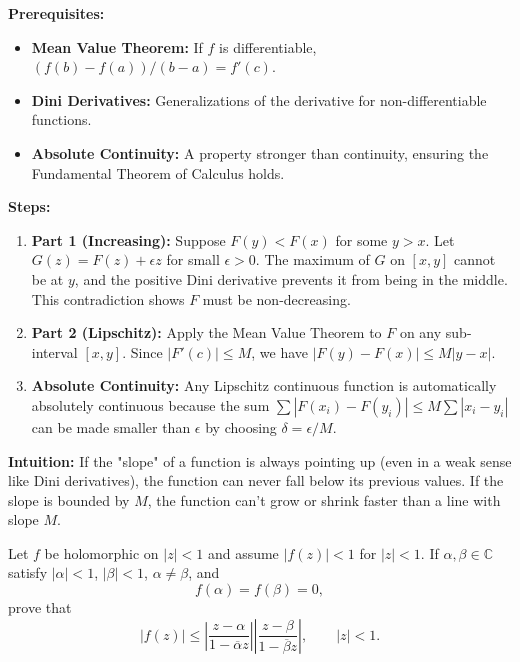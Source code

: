 \begin{solution}
\textbf{Prerequisites:}
\begin{itemize}
    \item \textbf{Mean Value Theorem:} If $f$ is differentiable, $(f(b)-f(a))/(b-a) = f'(c)$.
    \item \textbf{Dini Derivatives:} Generalizations of the derivative for non-differentiable functions.
    \item \textbf{Absolute Continuity:} A property stronger than continuity, ensuring the Fundamental Theorem of Calculus holds.
\end{itemize}

\textbf{Steps:}
\begin{enumerate}
    \item \textbf{Part 1 (Increasing):} Suppose $F(y) < F(x)$ for some $y > x$. Let $G(z) = F(z) + \epsilon z$ for small $\epsilon > 0$. The maximum of $G$ on $[x, y]$ cannot be at $y$, and the positive Dini derivative prevents it from being in the middle. This contradiction shows $F$ must be non-decreasing.
    \item \textbf{Part 2 (Lipschitz):} Apply the Mean Value Theorem to $F$ on any sub-interval $[x, y]$. Since $|F'(c)| \leq M$, we have $|F(y)-F(x)| \leq M|y-x|$.
    \item \textbf{Absolute Continuity:} Any Lipschitz continuous function is automatically absolutely continuous because the sum $\sum |F(x_i)-F(y_i)| \leq M \sum |x_i-y_i|$ can be made smaller than $\epsilon$ by choosing $\delta = \epsilon/M$.
\end{enumerate}

\textbf{Intuition:}
If the "slope" of a function is always pointing up (even in a weak sense like Dini derivatives), the function can never fall below its previous values. If the slope is bounded by $M$, the function can't grow or shrink faster than a line with slope $M$.
\end{solution}

\begin{exercise}
\label{analysis:2017:9}
Let $f$ be holomorphic on $|z|<1$ and assume $|f(z)|<1$ for $|z|<1$. If $\alpha,\beta\in\mathbb{C}$ satisfy $|\alpha|<1$, $|\beta|<1$, $\alpha\neq\beta$, and
\[
f(\alpha)=f(\beta)=0,
\]
prove that
\[
|f(z)|\leq
\left|\frac{z-\alpha}{1-\overline{\alpha}z}\right|
\left|\frac{z-\beta}{1-\overline{\beta}z}\right|,
\qquad |z|<1.
\]
\end{exercise}

